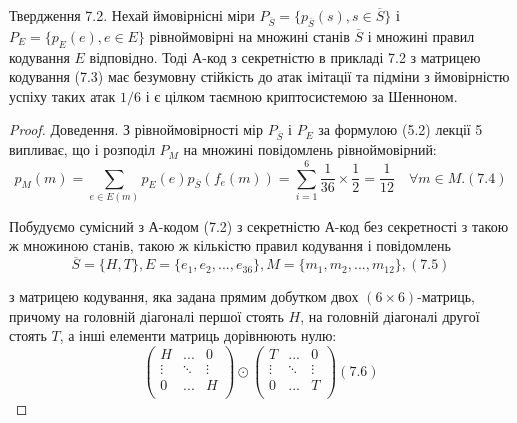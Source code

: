 \begin{claim}
    Твердження 7.2. Нехай ймовірнісні міри $P_{\overline{S}} = \{p_{\overline{S}}(s), s \in \overline{S}\}$ і $P_{E} = \{p_{E}(e), e \in E\}$ рівноймовірні на множині станів $\overline{S}$ і множині правил кодування $E$
    відповідно. Тоді А-код з секретністю в прикладі 7.2 з матрицею кодування (7.3)
    має безумовну стійкість до атак імітації та підміни з ймовірністю успіху таких
    атак $1/6$ і є цілком таємною криптосистемою за Шенноном.
\end{claim}
\begin{proof}
    Доведення. З рівноймовірності мір $P_{\overline{S}}$ і $P_E$ за формулою (5.2) лекції 5
    випливає, що і розподіл $P_M$ на множині повідомлень рівноймовірний:
    \begin{equation}
        p_M(m)
        = \sum_{e \in E(m)} p_E(e) p_{\overline{S}}(f_e(m))
        = \sum_{i=1}^6 \frac{1}{36} \times \frac{1}{2}
        = \frac{1}{12}
        \quad \forall m \in M. (7.4)
    \end{equation}
    
    Побудуємо сумісний з А-кодом (7.2) з секретністю А-код без секретності з
    такою ж множиною станів, такою ж кількістю правил кодування і повідомлень
    \begin{equation}
        \overline{S} = \{H, T\}, E = \{e_1, e_2, ..., e_{36}\}, M = \{m_1, m_2, ..., m_{12}\}, (7.5)
    \end{equation}
    
    з матрицею кодування, яка задана прямим добутком двох $(6 \times 6)$-матриць,
    причому на головній діагоналі першої стоять $H$, на головній діагоналі другої
    стоять $T$, а інші елементи матриць дорівнюють нулю:
    \begin{equation}
        \begin{pmatrix}
                H & ... & 0 \\
                \vdots & \ddots & \vdots \\
                0 & ... & H \\
            \end{pmatrix}
            \odot \begin{pmatrix}
                T & ... & 0 \\
                \vdots & \ddots & \vdots \\
                0 & ... & T \\
            \end{pmatrix} (7.6)
    \end{equation}
    

\end{proof}
